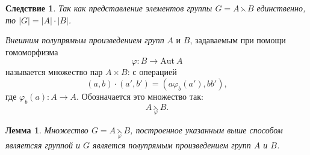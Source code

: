 \documentclass{article}
\newtheorem{corollary}{Следствие}[section]
\newtheorem{lemma}{Лемма}[section]
\begin{document}
\begin{corollary}
    Так как представление элементов группы $G = A \leftthreetimes B$ единственно, то $|G| = |A| \cdot |B|$.
\end{corollary}

\textit{Внешним полупрямым произведением групп} $A$ и $B$, задаваемым при помощи гомоморфизма $$\varphi: B \rightarrow \mathrm{Aut} \ A $$ называется множество пар $A \times B$: с операцией $$ (a, b) \cdot (a', b') = (a \varphi_b(a'), b b'), $$ где $\varphi_b(a): A \rightarrow A$. Обозначается это множество так:
\[
    A \underset{\varphi}{\leftthreetimes} B.
\]

\begin{lemma}
    Множество $G = A \underset{\varphi}{\leftthreetimes} B$, построенное указанным выше способом являетсяя группой и $G$ является полупрямым произведением групп $A$ и $B$.
\end{lemma}
\end{document}
